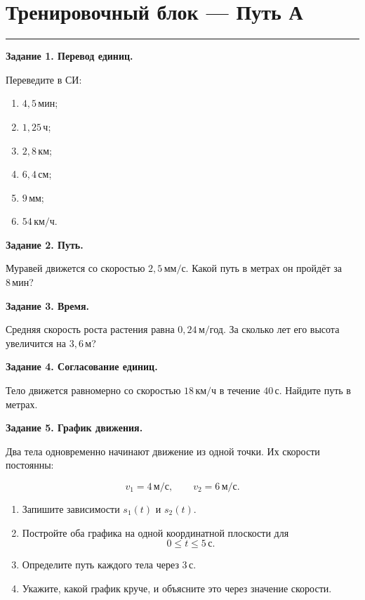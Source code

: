 \documentclass[a4paper,12pt]{article}
\newcommand{\sectionline}{%
  \par\vspace{0.15em}%
  \noindent\textcolor{lightaccent}{\rule{\linewidth}{0.7pt}}%
  \par\vspace{0.35em}%
}
\newcommand{\unit}[1]{\,\text{#1}}
\begin{document}
\clearpage

\section*{Тренировочный блок --- Путь А}
\sectionline

\textbf{Задание 1. Перевод единиц.}

Переведите в СИ:

\begin{enumerate}[label=\alph*)]

  \item
  $4{,}5\unit{мин}$;

  \item
  $1{,}25\unit{ч}$;

  \item
  $2{,}8\unit{км}$;

  \item
  $6{,}4\unit{см}$;

  \item
  $9\unit{мм}$;

  \item
  $54\unit{км/ч}$.

\end{enumerate}

\textbf{Задание 2. Путь.}

Муравей движется со скоростью
$2{,}5\unit{мм/с}$.
Какой путь в метрах он пройдёт за
$8\unit{мин}$?

\textbf{Задание 3. Время.}

Средняя скорость роста растения равна
$0{,}24\unit{м/год}$.
За сколько лет его высота увеличится на
$3{,}6\unit{м}$?

\textbf{Задание 4. Согласование единиц.}

Тело движется равномерно со скоростью
$18\unit{км/ч}$
в течение
$40\unit{с}$.
Найдите путь в метрах.

\textbf{Задание 5. График движения.}

Два тела одновременно начинают движение из одной точки.
Их скорости постоянны:

\[
  v_1=4\unit{м/с},
  \qquad
  v_2=6\unit{м/с}.
\]

\begin{enumerate}[label=\alph*)]

  \item
  Запишите зависимости
  $s_1(t)$
  и
  $s_2(t)$.

  \item
  Постройте оба графика
  на одной координатной плоскости
  для
  \[
    0\le t\le5\unit{с}.
  \]

  \item
  Определите путь каждого тела
  через
  $3\unit{с}$.

  \item
  Укажите,
  какой график круче,
  и объясните это через значение скорости.

\end{enumerate}
\end{document}
